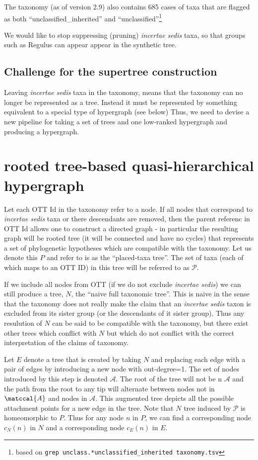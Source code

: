 \documentclass[11pt]{article}
\newcommand{\insed}{{\em incertae sedis}\xspace}
\newcommand{\specialHypergraph}{rooted tree-based quasi-hierarchical hypergraph \xspace}
\newcommand{\placedTaxa}{\ensuremath{\mathcal{P}}\xspace}
\newcommand{\placedTaxoTree}{\ensuremath{P}\xspace}
\newcommand{\placedTaxoTreeName}{placed-taxa tree\xspace}
\newcommand{\naiveFullTree}{\ensuremath{N}\xspace}
\newcommand{\augmentedFullTree}{\ensuremath{E}\xspace}
\newcommand{\naiveFullTreeName}{naive full taxonomic tree\xspace}
\newcommand{\corresponding}[2]{\ensuremath{c_{#2}(#1)}\xspace}
\begin{document}
The taxonomy (as of version 2.9) also contains 685 cases of taxa that are flagged as both
    ``unclassified\_inherited'' and  ``unclassified''\footnote{based on {\tt grep unclass.*unclassified\_inherited taxonomy.tsv}}

We would like to stop suppressing (pruning) \insed taxa, so that groups such as Regulus can appear
    appear in the synthetic tree.

\subsection{Challenge for the supertree construction}
Leaving \insed taxa in the taxonomy, means that the taxonomy can no longer be represented as 
    a tree.
Instead it must be represented by something equivalent to a special type of hypergraph (see below)
Thus, we need to devise a new pipeline for taking a set of trees and one low-ranked hypergraph and
    producing a hypergraph.

\section{\specialHypergraph}
Let each OTT Id in the taxonomy refer to a node.
If all nodes that correspond to \insed taxa or there descendants are removed,
    then the parent referenc in OTT Id allows one to construct 
    a directed graph - in particular the resulting graph will be rooted tree (it will be connected
    and have no cycles) that represents a set of phylogenetic hypotheses  which are compatible
    with the taxonomy.
Let us denote this \placedTaxoTree and refer to is as the ``\placedTaxoTreeName''.
The set of taxa (each of which maps to an OTT ID) in this tree will be referred to as \placedTaxa.

If we include all nodes from OTT (if we do not exclude \insed) we can still produce
    a tree,  \naiveFullTree, the ``\naiveFullTreeName''.
This is naive in the sense that the taxonomy does not really make the claim that an \insed
    taxon is excluded from its sister group (or the descendants of it sister group). 
Thus any resulution of \naiveFullTree can be said to be compatible with the taxonomy, but there
    exist other trees which conflict with \naiveFullTree but which do not conflict with
    the correct interpretation of the claims of taxonomy.

Let \augmentedFullTree denote a tree that is created by taking \naiveFullTree and replacing each
    edge with a pair of edges by introducing a new node with out-degree=1.
The set of nodes introduced by this step is denoted $\mathcal{A}$.
The root of the tree will not be n $\mathcal{A}$ and the path from the root to any tip will alternate
    between nodes not in $\matccal{A}$ and nodes in $\mathcal{A}$.
This augmented tree depicts all the possible attachment points for a new edge in the tree.
Note that \naiveFullTree tree induced by \placedTaxa is homeomorphic to \placedTaxoTree.
Thus for any node $n$ in \placedTaxoTree, we can find a corresponding node 
  \corresponding{n}{\naiveFullTree} in \naiveFullTree and a corresponding node
   \corresponding{n}{\augmentedFullTree} in \augmentedFullTree.
\end{document}
